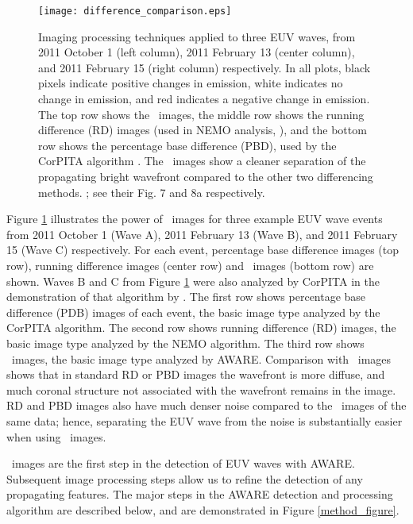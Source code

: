 \begin{figure}
\begin{center}
\texttt{[image: difference\_comparison.eps]}
\caption{Imaging processing techniques applied to three EUV waves,
  from 2011 October 1 (left column), 2011 February 13 (center column),
  and 2011 February 15 (right column) respectively. In all plots,
  black pixels indicate positive changes in emission, white indicates
  no change in emission, and red indicates a negative change in
  emission. The top row shows the \RDP\ images, the middle row shows
  the running difference (RD) images (used in NEMO analysis,
  \citep{2005SoPh..228..265P}), and the bottom row shows the
  percentage base difference (PBD), used by the CorPITA algorithm
  \citep{2014SoPh..289.3279L}.  The \RDP\ images show a cleaner
  separation of the propagating bright wavefront compared to the other
  two differencing methods.  \cite{2014SoPh..289.3279L}; see their
  Fig. 7 and 8a respectively.}
\label{rpdm_figure}
\end{center}
\end{figure}

Figure \ref{rpdm_figure} illustrates the power of \RDP\ images for
three example EUV wave events from 2011 October 1 (Wave A), 2011
February 13 (Wave B), and 2011 February 15 (Wave C) respectively. For
each event, percentage base difference images (top row), running
difference images (center row) and \RDP\ images (bottom row) are
shown. Waves B and C from Figure \ref{rpdm_figure} were also analyzed
by CorPITA in the demonstration of that algorithm by
\citet{2014SoPh..289.3279L}.  The first row shows percentage base
difference (PDB) images of each event, the basic image type analyzed
by the CorPITA algorithm.  The second row shows running difference
(RD) images, the basic image type analyzed by the NEMO algorithm.  The
third row shows \RDP\ images, the basic image type analyzed by
AWARE. Comparison with \RDP\ images shows that in standard RD or PBD
images the wavefront is more diffuse, and much coronal structure not
associated with the wavefront remains in the image. RD and PBD images
also have much denser noise compared to the \RDP\ images of the same
data; hence, separating the EUV wave from the noise is substantially
easier when using \RDP\ images.

\RDP\ images are the first step in the detection of EUV waves with
AWARE. Subsequent image processing steps allow us to refine the
detection of any propagating features. The major steps in the AWARE
detection and processing algorithm are described below, and are
demonstrated in Figure \ref{method_figure}.

